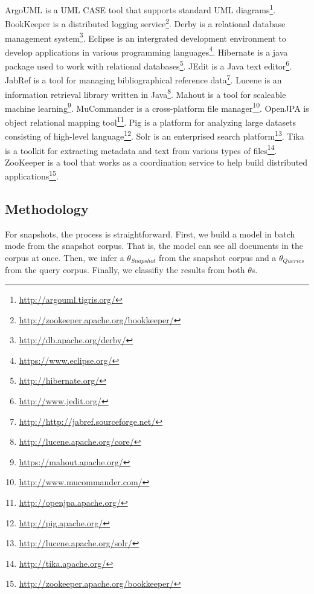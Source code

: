 ArgoUML is a UML CASE tool that supports standard UML diagrams\footnote{\url{http://argouml.tigris.org/}}.
BookKeeper is a distributed logging service\footnote{\url{http://zookeeper.apache.org/bookkeeper/}}.
Derby is a relational database management system\footnote{\url{http://db.apache.org/derby/}}.
Eclipse is an intergrated development environment to develop applications in various programming languages\footnote{\url{https://www.eclipse.org/}}.
Hibernate is a java package used to work with relational databases\footnote{\url{http://hibernate.org/}}.
JEdit is a Java text editor\footnote{\url{http://www.jedit.org/}}.
JabRef is a tool for managing bibliographical reference data\footnote{\url{http://http://jabref.sourceforge.net/}}.
Lucene is an information retrieval library written in Java\footnote{\url{http://lucene.apache.org/core/}}.
Mahout is a tool for scaleable machine learning\footnote{\url{https://mahout.apache.org/}}.
MuCommander is a cross-platform file manager\footnote{\url{http://www.mucommander.com/}}.
OpenJPA is object relational mapping tool\footnote{\url{http://openjpa.apache.org/}}.
Pig is a platform for analyzing large datasets consisting of high-level language\footnote{\url{http://pig.apache.org/}}.
Solr is an enterprised search platform\footnote{\url{http://lucene.apache.org/solr/}}.
Tika is a toolkit for extracting metadata and text from various types of files\footnote{\url{http://tika.apache.org/}}.
ZooKeeper is a tool that works as a coordination service to help build distributed applications\footnote{\url{http://zookeeper.apache.org/bookkeeper/}}.



\subsection{Methodology}
\label{sec:methodology}

For snapshots, the process is straightforward.
First, we build a model in batch mode from the snapshot corpus.
That is, the model can see all documents in the corpus at once.
Then, we infer a $\theta_{Snapshot}$ from the snapshot corpus
and a $\theta_{Queries}$ from the query corpus.
Finally, we classifiy the results from both $\theta$s.

\begin{comment}
\begin{enumerate}
    \item Build model from the snapshot corpus in batch mode
    \item Infer a $\theta_{Snapshot}$ from the snapshot corpus
    \item Infer a $\theta_{Queries}$ from the query corpus
    \item Classifiy, or rank, the results from both $\theta$s
\end{enumerate}
\end{comment}


